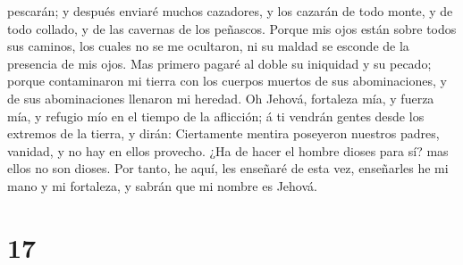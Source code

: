 pescarán; y después enviaré muchos cazadores, y los cazarán de todo
monte, y de todo collado, y de las cavernas de los peñascos.
 Porque mis ojos están sobre todos sus caminos, los cuales
no se me ocultaron, ni su maldad se esconde de la presencia de mis ojos.
 Mas primero pagaré al doble su iniquidad y su pecado;
porque contaminaron mi tierra con los cuerpos muertos de sus
abominaciones, y de sus abominaciones llenaron mi heredad. 
Oh Jehová, fortaleza mía, y fuerza mía, y refugio mío en el tiempo de la
aflicción; á ti vendrán gentes desde los extremos de la tierra, y dirán:
Ciertamente mentira poseyeron nuestros padres, vanidad, y no hay en
ellos provecho.  ¿Ha de hacer el hombre dioses para sí? mas
ellos no son dioses.  Por tanto, he aquí, les enseñaré de
esta vez, enseñarles he mi mano y mi fortaleza, y sabrán que mi nombre
es Jehová.

\hypertarget{section-16}{%
\section{17}\label{section-16}}

